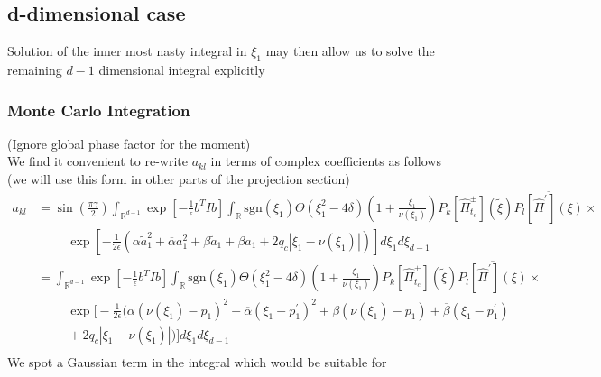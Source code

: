 \subsection{d-dimensional case}
Solution of the inner most nasty integral in $\xi_1$ may then allow 
us to solve the remaining $d-1$ dimensional integral explicitly
\subsubsection{Monte Carlo Integration}
(Ignore global phase factor for the moment)
\\
We find it convenient to re-write $a_{kl}$ in terms of complex 
coefficients as follows (we will use this form in other parts 
of the projection section)
\begin{equation}
  \begin{split}
    a_{kl} &= \sin\left(\frac{\pi \gamma}{2}\right) 
    \int_{\mathbb{R}^{d-1}} \exp{\left[ -\frac{1}{\epsilon}b^TIb  \right]}
    \int_{\mathbb{R}} \text{sgn}(\xi_1) \Theta(\xi_1^2 - 4\delta)\left( 1 + \frac{\xi_1}{\nu(\xi_1)} \right)
      P_k[\hat{\Pi}^{\pm}_{t_c}](\tilde{\xi})
      \overline{ P_l[\hat{\Pi}^\prime](\xi)} 
    \times 
    \\
    &
    \hspace{1cm}
    \exp{\left[-\frac{1}{2\epsilon} 
        \left( \alpha \tilde{a}_1^2 + \overline{\alpha} a_1^2
        + \beta \tilde{a}_1 + \overline{\beta} a_1 + 2q_c|\xi_1 - \nu(\xi_1)|
      \right) 
    \right]}  d \xi_1 d\xi_{d-1}
    \\
    &= \int_{\mathbb{R}^{d-1}} \exp{\left[ -\frac{1}{\epsilon}b^TIb  \right]}
    \int_{\mathbb{R}} \text{sgn}(\xi_1) \Theta(\xi_1^2 - 4\delta)\left( 1 + \frac{\xi_1}{\nu(\xi_1)} \right)
      P_k[\hat{\Pi}^{\pm}_{t_c}](\tilde{\xi})
      \overline{ P_l[\hat{\Pi}^\prime](\xi)} 
    \times 
    \\
    &
    \hspace{1cm}
    \exp \Bigg[-\frac{1}{2\epsilon} 
        \Big( \alpha (\nu(\xi_1) - p_1)^2 + \overline{\alpha} (\xi_1 - p_1^\prime)^2
          + \beta (\nu(\xi_1) - p_1) + \overline{\beta} (\xi_1 - p_1^\prime)
    \\
    &
    \hspace{1cm}
    + 2q_c|\xi_1 - \nu(\xi_1)|
      \Big) 
    \Bigg]  d \xi_1 d\xi_{d-1}
    \\
  \end{split}
\end{equation}
We spot a Gaussian term in the integral which would be suitable for 
